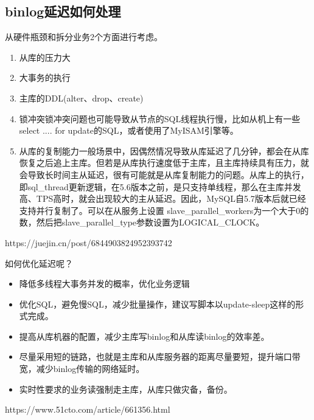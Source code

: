 \documentclass[../../../interview-questions.tex]{subfiles}
\begin{document}
\subsection{binlog延迟如何处理}

从硬件瓶颈和拆分业务2个方面进行考虑。

\begin{enumerate}
    \item {从库的压力大}
    \item {大事务的执行}
    \item {主库的DDL(alter、drop、create)}
    \item {锁冲突}锁冲突问题也可能导致从节点的SQL线程执行慢，比如从机上有一些select .... for update的SQL，或者使用了MyISAM引擎等。
    \item {从库的复制能力}一般场景中，因偶然情况导致从库延迟了几分钟，都会在从库恢复之后追上主库。但若是从库执行速度低于主库，且主库持续具有压力，就会导致长时间主从延迟，很有可能就是从库复制能力的问题。从库上的执行，即sql\_thread更新逻辑，在5.6版本之前，是只支持单线程，那么在主库并发高、TPS高时，就会出现较大的主从延迟。因此，MySQL自5.7版本后就已经支持并行复制了。可以在从服务上设置 slave\_parallel\_workers为一个大于0的数，然后把slave\_parallel\_type参数设置为LOGICAL\_CLOCK。
\end{enumerate}


https://juejin.cn/post/6844903824952393742

如何优化延迟呢？

\begin{itemize}
    \item {降低多线程大事务并发的概率，优化业务逻辑}
    \item {优化SQL，避免慢SQL，减少批量操作，建议写脚本以update-sleep这样的形式完成。}
    \item {提高从库机器的配置，减少主库写binlog和从库读binlog的效率差。}
    \item {尽量采用短的链路，也就是主库和从库服务器的距离尽量要短，提升端口带宽，减少binlog传输的网络延时。}
    \item {实时性要求的业务读强制走主库，从库只做灾备，备份。}
\end{itemize}

https://www.51cto.com/article/661356.html
\end{document}
